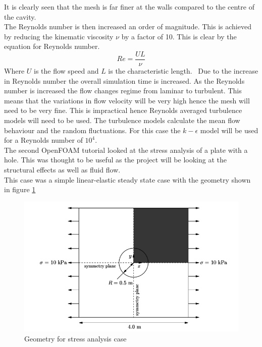\documentclass[]{report}
\begin{document}
It is clearly seen that the mesh is far finer at the walls compared to the centre of the cavity.
\\
The Reynolds number is then increased an order of magnitude. This is achieved by reducing the kinematic viscosity $\nu$ by a factor of 10. This is clear by the equation for Reynolds number.
\begin{equation}
Re = \frac{UL}{\nu}
\label{eq:reynolds}
\end{equation}
Where $U$ is the flow speed and $L$ is the characteristic length.
 \
 Due to the increase in Reynolds number the overall simulation time is increased. As the Reynolds number is increased the flow changes regime from laminar to turbulent. This means that the variations in flow velocity will be very high hence the mesh will need to be very fine. This is impractical hence Reynolds averaged turbulence models will need to be used. The turbulence models calculate the mean flow behaviour and the random fluctuations. For this case the $k-\epsilon$ model will be used for a Reynolds number of $10^4$.
 \\

The second OpenFOAM tutorial looked at the stress analysis of a plate with a hole. This was thought to be useful as the project will be looking at the structural effects as well as fluid flow.\\

This case was a simple linear-elastic steady state case with the geometry shown in figure \ref{fig:stress_geometry}

\begin{figure}[h]
	\centering
	\includegraphics[scale=0.5]{stress_geometry}
	\caption{Geometry for stress analysis case}
	\label{fig:stress_geometry}
\end{figure}
\end{document}
